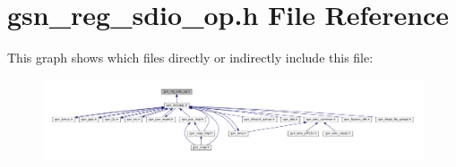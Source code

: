 \hypertarget{a00570}{
\section{gsn\_\-reg\_\-sdio\_\-op.h File Reference}
\label{a00570}
}
This graph shows which files directly or indirectly include this file:
\nopagebreak
\begin{figure}[H]
\begin{center}
\leavevmode
\includegraphics[width=400pt]{a00807}
\end{center}
\end{figure}
